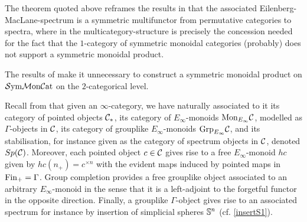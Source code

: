 The theorem quoted above reframes the results in
\cite{EM} that the associated Eilenberg-MacLane-spectrum is a symmetric
multifunctor from permutative categories to spectra, where in
\cite{EM} the multicategory-structure is precisely the concession needed
for the fact that the $1$-category of symmetric monoidal categories 
(probably) does not support a symmetric monoidal product.

The results of \cite{GGN} make it unnecessary to construct a symmetric
monoidal product on $\SymMonCat$ on the $2$-categorical level.

Recall from \cite{Lu2,GGN} that given an $\infty$-category, we have naturally
associated to it its category of pointed objects $\C_*$, its category
of $E_\infty$-monoids $\mathrm{Mon}_{E_\infty}\C$, modelled as $\Gamma$-objects
in $\C$, its category of grouplike $E_\infty$-monoids $\mathrm{Grp}_{E_\infty}\C$,
and its stabilisation, for instance given as the category of spectrum objects
in $\C$, denoted $Sp(\C)$. Moreover, each pointed object $c\in\C$ gives rise to a free $E_\infty$-monoid $hc$
given by $hc(n_+)=c^{\times n}$ with the evident maps induced by pointed maps in $\Fi=\Gamma$.
Group completion provides a free grouplike object associated to an arbitrary
$E_\infty$-monoid in the sense that it is a left-adjoint to the forgetful
functor in the opposite direction. Finally, a grouplike $\Gamma$-object gives
rise to an associated spectrum for instance by insertion of simplicial spheres 
$\S^n$ (cf. \ref{insertS1}).

{}


